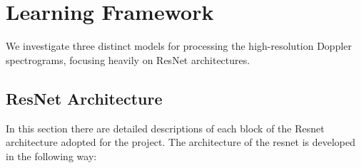 \section{Learning Framework}
\label{sec:architecture}

We investigate three distinct models for processing the high-resolution Doppler spectrograms, focusing heavily on ResNet architectures.

\subsection{ResNet Architecture}
In this section there are detailed descriptions of each block of the Resnet architecture adopted for the project. The architecture of the resnet is developed in the following way:

